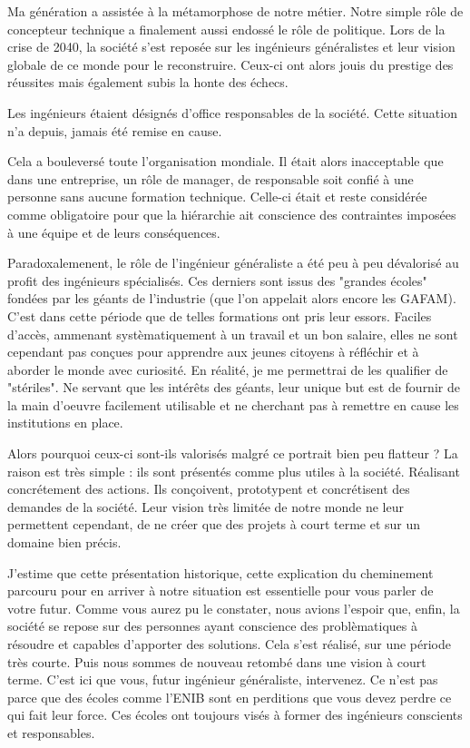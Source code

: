 Ma génération a assistée à la métamorphose de notre métier. Notre simple rôle de concepteur technique a finalement aussi endossé le rôle de politique.
Lors de la crise de 2040, la société s'est reposée sur les ingénieurs généralistes et leur vision globale de ce monde pour le reconstruire.
Ceux-ci ont alors jouis du prestige des réussites mais également subis la honte des échecs.

Les ingénieurs étaient désignés d'office responsables de la société. Cette situation n'a depuis, jamais été remise en cause.

Cela a bouleversé toute l'organisation mondiale. Il était alors inacceptable que dans une entreprise, un rôle de manager, de responsable soit confié à
une personne sans aucune formation technique. Celle-ci était et reste considérée comme obligatoire pour que la hiérarchie ait conscience des contraintes
imposées à une équipe et de leurs conséquences.

Paradoxalemenent, le rôle de l'ingénieur généraliste a été peu à peu dévalorisé au profit des ingénieurs spécialisés.
Ces derniers sont issus des "grandes écoles" fondées par les géants de l'industrie (que l'on appelait alors encore les GAFAM). C'est dans cette période
que de telles formations ont pris leur essors. Faciles d'accès, ammenant systèmatiquement à un travail et un bon salaire, elles ne sont cependant pas
conçues pour apprendre aux jeunes citoyens à réfléchir et à aborder le monde avec curiosité. En réalité, je me permettrai de les qualifier de "stériles".
Ne servant que les intérêts des géants, leur unique but est de fournir de la main d'oeuvre facilement utilisable et ne cherchant pas à remettre en cause
les institutions en place.

Alors pourquoi ceux-ci sont-ils valorisés malgré ce portrait bien peu flatteur ? La raison est très simple : ils sont présentés comme plus utiles à la
société. Réalisant concrétement des actions. Ils conçoivent, prototypent et concrétisent des demandes de la société.
Leur vision très limitée de notre monde ne leur permettent cependant, de ne créer que des projets à court terme et sur un domaine bien précis.

J'estime que cette présentation historique, cette explication du cheminement parcouru pour en arriver à notre situation est essentielle pour vous parler
de votre futur.
Comme vous aurez pu le constater, nous avions l'espoir que, enfin, la société se repose sur des personnes ayant conscience des problèmatiques à résoudre
et capables d'apporter des solutions.
Cela s'est réalisé, sur une période très courte. Puis nous sommes de nouveau retombé dans une vision à court terme.
C'est ici que vous, futur ingénieur généraliste, intervenez. Ce n'est pas parce que des écoles comme l'ENIB sont en perditions que vous devez perdre
ce qui fait leur force.
Ces écoles ont toujours visés à former des ingénieurs conscients et responsables.

